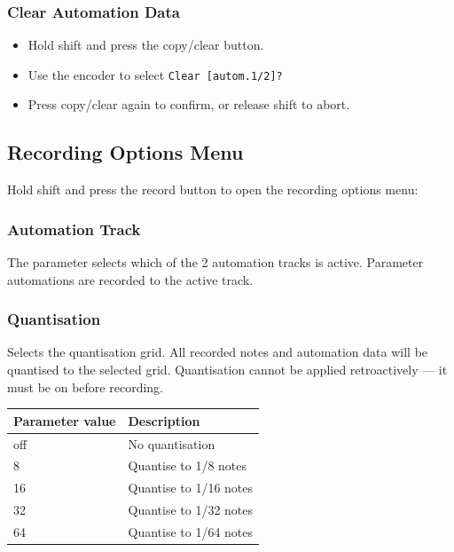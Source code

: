\subsubsection{Clear Automation Data}\label{clear-automation-data}

\begin{itemize}
\tightlist
\item
  Hold shift and press the copy/clear button.
\item
  Use the encoder to select \texttt{Clear\ {[}autom.1/2{]}?}
\item
  Press copy/clear again to confirm, or release shift to abort.
\end{itemize}

\subsection{Recording Options Menu}\label{recording-options-menu}

Hold shift and press the record button to open the recording options
menu:


\subsubsection{Automation Track}\label{automation-track}

The  parameter selects which of the 2 automation tracks is
active. Parameter automations are recorded to the active track.

\subsubsection{Quantisation}\label{quantisation}

Selects the quantisation grid. All recorded notes and automation data
will be quantised to the selected grid. Quantisation cannot be applied
retroactively --- it must be on before recording.

{\def\LTcaptype{none} %
\begin{longtable}[]{@{}ll@{}}
\toprule\noalign{}
Parameter value & Description \\
\midrule\noalign{}
\endhead
\bottomrule\noalign{}
\endlastfoot
off & No quantisation \\
8 & Quantise to 1/8 notes \\
16 & Quantise to 1/16 notes \\
32 & Quantise to 1/32 notes \\
64 & Quantise to 1/64 notes \\
\end{longtable}
}

